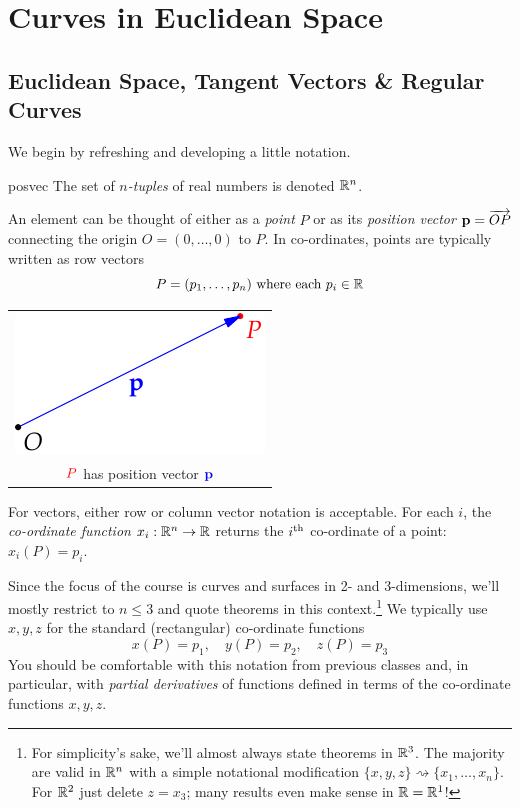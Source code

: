 \section{Curves in Euclidean Space}

\subsection{Euclidean Space, Tangent Vectors \& Regular Curves}\label{sec:euclid}

We begin by refreshing and developing a little notation.

\begin{defn}{}{posvec}
	The set of \emph{$n$-tuples} of real numbers is denoted $\mathbb{R}^n$.\par
	\begin{minipage}[t]{0.7\linewidth}\vspace{-5pt}
	An element can be thought of either as a \emph{point} $P$ or as its \emph{position vector} ${\mathbf{p}}=\overrightarrow{OP}$ connecting the origin $O=(0,\ldots,0)$ to $P$.\smallbreak
	In co-ordinates, points are typically written as row vectors
	\[P=({p}_1,\ldots,{p}_{n})\text{ where each }p_i\in\mathbb{R}\]
	\end{minipage}\hfill\begin{minipage}[t]{0.29\linewidth}\vspace{-15pt}
	\flushright\begin{tabular}{c}
	\includegraphics{euclid-posvec}\\
	$\textcolor{red}{P}$ has position vector $\textcolor{blue}{{\mathbf{p}}}$
	\end{tabular}
	\end{minipage}\smallbreak
	For vectors, either row or column vector notation is acceptable.\smallbreak
	For each $i$, the \emph{co-ordinate function} $x_i:\mathbb{R}^n\to\mathbb{R}$ returns the $i\textsuperscript{th}$ co-ordinate of a point: $x_i(P)=p_i$.
\end{defn}


Since the focus of the course is curves and surfaces in 2- and 3-dimensions, we'll mostly restrict to $n\le 3$ and quote theorems in this context.\footnote{For simplicity's sake, we'll almost always state theorems in $\mathbb{R}^3$. The majority are valid in $\mathbb{R}^n$ with a simple notational modification $\{x,y,z\}\rightsquigarrow \{x_1,\ldots,x_n\}$. For $\mathbb{R}^2$ just delete $z=x_3$; many results even make sense in $\mathbb{R}=\mathbb{R}^1$!}  We typically use $x,y,z$ for the standard (rectangular) co-ordinate functions
\[x(P)=p_1,\quad y(P)=p_2,\quad z(P)=p_3\]
You should be comfortable with this notation from previous classes and, in particular, with \emph{partial derivatives} of functions defined in terms of the co-ordinate functions $x,y,z$.

